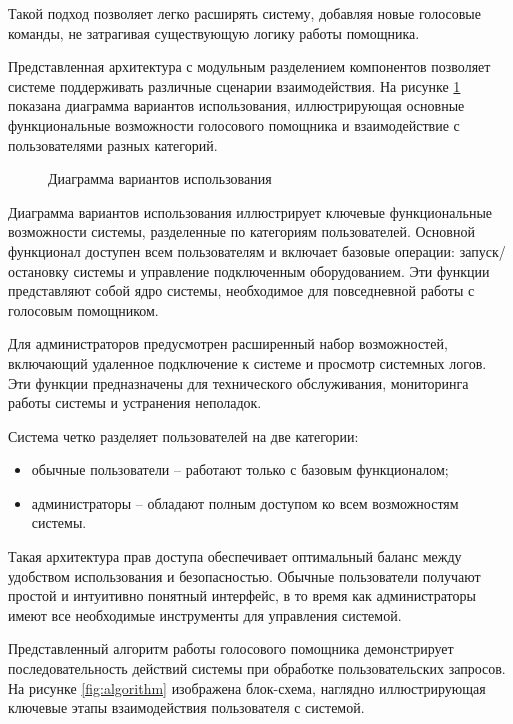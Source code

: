 Такой подход позволяет легко расширять систему, добавляя новые голосовые команды, не затрагивая существующую логику работы помощника.

Представленная архитектура с модульным разделением компонентов позволяет системе поддерживать различные сценарии взаимодействия. На рисунке \ref{fig:use_case_diagram} показана диаграмма вариантов использования, иллюстрирующая основные функциональные возможности голосового помощника и взаимодействие с пользователями разных категорий.

\begin{figure}[H]
	\centering
	\caption{Диаграмма вариантов использования}
	\label{fig:use_case_diagram}
\end{figure}

Диаграмма вариантов использования иллюстрирует ключевые функциональные возможности системы, разделенные по категориям пользователей. Основной функционал доступен всем пользователям и включает базовые операции: запуск/остановку системы и управление подключенным оборудованием. Эти функции представляют собой ядро системы, необходимое для повседневной работы с голосовым помощником.

Для администраторов предусмотрен расширенный набор возможностей, включающий удаленное подключение к системе и просмотр системных логов. Эти функции предназначены для технического обслуживания, мониторинга работы системы и устранения неполадок.

Система четко разделяет пользователей на две категории:
\begin{itemize}
	\item обычные пользователи -- работают только с базовым функционалом;
	\item администраторы -- обладают полным доступом ко всем возможностям системы.
\end{itemize}

Такая архитектура прав доступа обеспечивает оптимальный баланс между удобством использования и безопасностью. Обычные пользователи получают простой и интуитивно понятный интерфейс, в то время как администраторы имеют все необходимые инструменты для управления системой.


Представленный алгоритм работы голосового помощника демонстрирует последовательность действий системы при обработке пользовательских запросов. На рисунке \ref{fig:algorithm} изображена блок-схема, наглядно иллюстрирующая ключевые этапы взаимодействия пользователя с системой.

